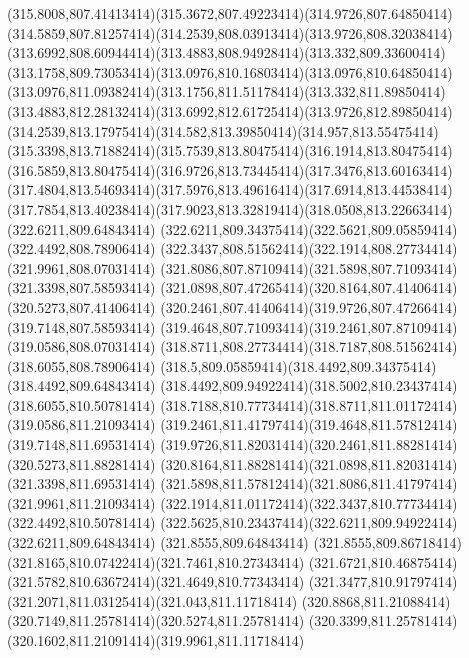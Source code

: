 {{	\curveto(315.8008,807.41413414)(315.3672,807.49223414)(314.9726,807.64850414)
	\curveto(314.5859,807.81257414)(314.2539,808.03913414)(313.9726,808.32038414)
	\curveto(313.6992,808.60944414)(313.4883,808.94928414)(313.332,809.33600414)
	\curveto(313.1758,809.73053414)(313.0976,810.16803414)(313.0976,810.64850414)
	\curveto(313.0976,811.09382414)(313.1756,811.51178414)(313.332,811.89850414)
	\curveto(313.4883,812.28132414)(313.6992,812.61725414)(313.9726,812.89850414)
	\curveto(314.2539,813.17975414)(314.582,813.39850414)(314.957,813.55475414)
	\curveto(315.3398,813.71882414)(315.7539,813.80475414)(316.1914,813.80475414)
	\curveto(316.5859,813.80475414)(316.9726,813.73445414)(317.3476,813.60163414)
	\curveto(317.4804,813.54693414)(317.5976,813.49616414)(317.6914,813.44538414)
	\curveto(317.7854,813.40238414)(317.9023,813.32819414)(318.0508,813.22663414)
	\closepath
	\moveto(322.6211,809.64843414)
	\curveto(322.6211,809.34375414)(322.5621,809.05859414)(322.4492,808.78906414)
	\curveto(322.3437,808.51562414)(322.1914,808.27734414)(321.9961,808.07031414)
	\curveto(321.8086,807.87109414)(321.5898,807.71093414)(321.3398,807.58593414)
	\curveto(321.0898,807.47265414)(320.8164,807.41406414)(320.5273,807.41406414)
	\curveto(320.2461,807.41406414)(319.9726,807.47266414)(319.7148,807.58593414)
	\curveto(319.4648,807.71093414)(319.2461,807.87109414)(319.0586,808.07031414)
	\curveto(318.8711,808.27734414)(318.7187,808.51562414)(318.6055,808.78906414)
	\curveto(318.5,809.05859414)(318.4492,809.34375414)(318.4492,809.64843414)
	\curveto(318.4492,809.94922414)(318.5002,810.23437414)(318.6055,810.50781414)
	\curveto(318.7188,810.77734414)(318.8711,811.01172414)(319.0586,811.21093414)
	\curveto(319.2461,811.41797414)(319.4648,811.57812414)(319.7148,811.69531414)
	\curveto(319.9726,811.82031414)(320.2461,811.88281414)(320.5273,811.88281414)
	\curveto(320.8164,811.88281414)(321.0898,811.82031414)(321.3398,811.69531414)
	\curveto(321.5898,811.57812414)(321.8086,811.41797414)(321.9961,811.21093414)
	\curveto(322.1914,811.01172414)(322.3437,810.77734414)(322.4492,810.50781414)
	\curveto(322.5625,810.23437414)(322.6211,809.94922414)(322.6211,809.64843414)
	\closepath
	\moveto(321.8555,809.64843414)
	\curveto(321.8555,809.86718414)(321.8165,810.07422414)(321.7461,810.27343414)
	\curveto(321.6721,810.46875414)(321.5782,810.63672414)(321.4649,810.77343414)
	\curveto(321.3477,810.91797414)(321.2071,811.03125414)(321.043,811.11718414)
	\curveto(320.8868,811.21088414)(320.7149,811.25781414)(320.5274,811.25781414)
	\curveto(320.3399,811.25781414)(320.1602,811.21091414)(319.9961,811.11718414)
}}
